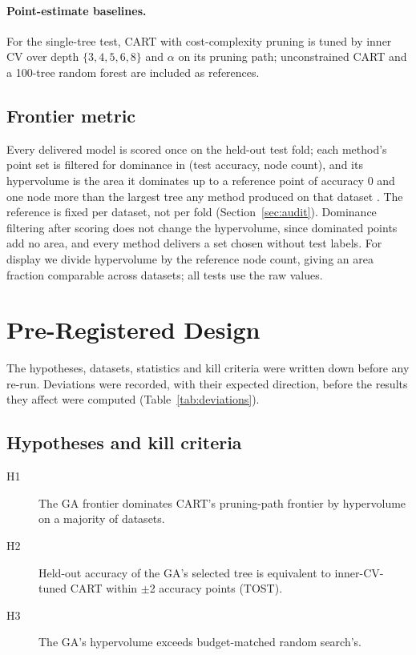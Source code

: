 \documentclass[11pt]{article}
\newcommand{\GA}{GA\xspace}
\begin{document}
\paragraph{Point-estimate baselines.} For the single-tree test, CART with cost-complexity
pruning is tuned by inner CV over depth $\{3,4,5,6,8\}$ and $\alpha$ on its pruning path;
unconstrained CART and a 100-tree random forest are included as references.

\subsection{Frontier metric}
Every delivered model is scored once on the held-out test fold; each method's point set is
filtered for dominance in (test accuracy, node count), and its hypervolume is the area it
dominates up to a reference point of accuracy 0 and one node more than the largest tree
any method produced on that dataset \citep{zitzler1999}. The reference is fixed per
dataset, not per fold (Section~\ref{sec:audit}). Dominance filtering after scoring does
not change the hypervolume, since dominated points add no area, and every method delivers
a set chosen without test labels. For display we divide hypervolume by the reference node
count, giving an area fraction comparable across datasets; all tests use the raw values.

\section{Pre-Registered Design}
\label{sec:design}

The hypotheses, datasets, statistics and kill criteria were written down before any
re-run. Deviations were recorded, with their expected direction, before the results they
affect were computed (Table~\ref{tab:deviations}).

\subsection{Hypotheses and kill criteria}
\begin{description}
\item[H1] The \GA frontier dominates CART's pruning-path frontier by hypervolume on a
majority of datasets.
\item[H2] Held-out accuracy of the \GA's selected tree is equivalent to inner-CV-tuned
CART within $\pm$2 accuracy points (TOST).
\item[H3] The \GA's hypervolume exceeds budget-matched random search's.
\end{description}
\end{document}
